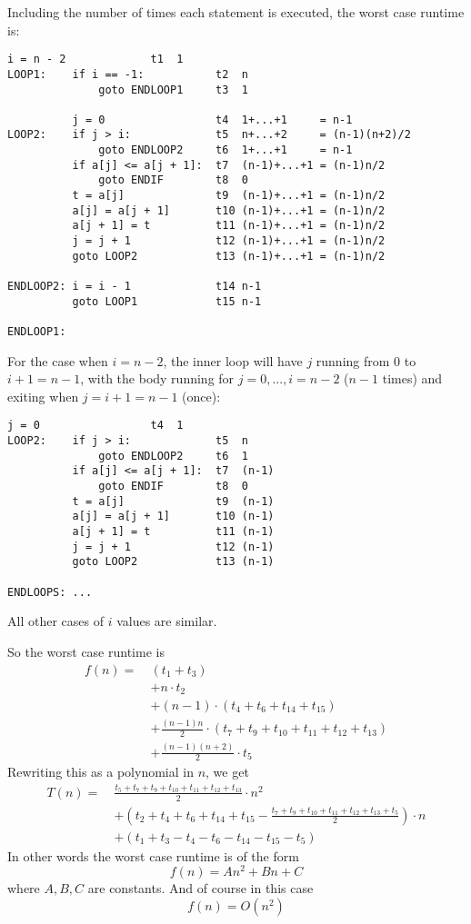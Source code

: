 Including the number of times each statement is executed,
the worst case runtime is:
\begin{Verbatim}[frame=single, fontsize=\footnotesize]
          i = n - 2             t1  1
LOOP1:    if i == -1:           t2  n
              goto ENDLOOP1     t3  1
                                
          j = 0                 t4  1+...+1     = n-1
LOOP2:    if j > i:             t5  n+...+2     = (n-1)(n+2)/2
              goto ENDLOOP2     t6  1+...+1     = n-1
          if a[j] <= a[j + 1]:  t7  (n-1)+...+1 = (n-1)n/2
              goto ENDIF        t8  0 
          t = a[j]              t9  (n-1)+...+1 = (n-1)n/2
          a[j] = a[j + 1]       t10 (n-1)+...+1 = (n-1)n/2
          a[j + 1] = t          t11 (n-1)+...+1 = (n-1)n/2
          j = j + 1             t12 (n-1)+...+1 = (n-1)n/2
          goto LOOP2            t13 (n-1)+...+1 = (n-1)n/2

ENDLOOP2: i = i - 1             t14 n-1
          goto LOOP1            t15 n-1

ENDLOOP1:
\end{Verbatim}

For the case when $i = n - 2$, the inner loop 
will have $j$ running from $0$ to $i + 1 = n - 1$,
with the body running for $j = 0, ..., i = n - 2$ ($n - 1$ times) and 
exiting when $j = i + 1 = n - 1$ (once):
\begin{Verbatim}[frame=single, fontsize=\footnotesize]
          j = 0                 t4  1
LOOP2:    if j > i:             t5  n
              goto ENDLOOP2     t6  1
          if a[j] <= a[j + 1]:  t7  (n-1)
              goto ENDIF        t8  0
          t = a[j]              t9  (n-1)
          a[j] = a[j + 1]       t10 (n-1)
          a[j + 1] = t          t11 (n-1)
          j = j + 1             t12 (n-1)
          goto LOOP2            t13 (n-1)

ENDLOOPS: ...
\end{Verbatim}
All other cases of $i$ values are similar.

So the worst case runtime is
\begin{align*}
f(n) = \
& (t_1 + t_3) \\
&+ n \cdot t_2 \\
&+ (n-1) \cdot (t_4 + t_6 + t_{14} + t_{15}) \\
&+ \frac{(n-1)n}{2} \cdot (t_{7} + t_{9} + t_{10} + t_{11} + t_{12} + t_{13}) \\
&+ \frac{(n-1)(n+2)}{2} \cdot t_5
\end{align*}
Rewriting this as a polynomial in $n$, we get
\begin{align*}
T(n) = \
&\frac{t_5 + t_7 + t_9 + t_{10} + t_{11} + t_{12} + t_{13}}{2} \cdot  n^2 \\
&+ \left(
   t_2 + t_4 + t_6 + t_{14} + t_{15}
   - \frac{t_7 + t_9 + t_{10} + t_{11} + t_{12} + t_{13} + t_5}{2}
   \right) \cdot n  \\
&+ \left(
   t_1 + t_3 - t_4 - t_6 - t_{14} - t_{15}- t_5 
   \right)
\end{align*}
In other words the worst case runtime is of the form
\[
f(n) = An^2 + Bn + C
\]
where $A,B,C$ are constants.
And of course in this case
\[
f(n) = O(n^2)
\]

